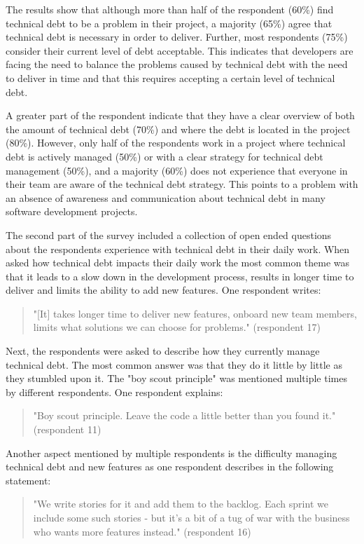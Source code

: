 

The results show that although more than half of the respondent (60\%) find technical debt to be a problem in their project, a majority (65\%) agree that technical debt is necessary in order to deliver.
Further, most respondents (75\%) consider their current level of debt acceptable.
This indicates that developers are facing the need to balance the problems caused by technical debt with the need to deliver in time and that this requires accepting a certain level of technical debt.

A greater part of the respondent indicate that they have a clear overview of both the amount of technical debt (70\%) and where the debt is located in the project (80\%).
However, only half of the respondents work in a project where technical debt is actively managed (50\%) or with a clear strategy for technical debt management (50\%), and a majority (60\%) does not experience that everyone in their team are aware of the technical debt strategy.
This points to a problem with an absence of awareness and communication about technical debt in many software development projects.

The second part of the survey included a collection of open ended questions about the respondents experience with technical debt in their daily work.
When asked how technical debt impacts their daily work the most common theme was that it leads to a slow down in the development process, results in longer time to deliver and limits the ability to add new features.
One respondent writes:
\begin{quote}
  "[It] takes longer time to deliver new features, onboard new team members, limits what solutions we can choose for problems." (respondent 17)
\end{quote}

Next, the respondents were asked to describe how they currently manage technical debt.
The most common answer was that they do it little by little as they stumbled upon it.
The "boy scout principle" was mentioned multiple times by different respondents.
One respondent explains:
\begin{quote}
  "Boy scout principle. Leave the code a little better than you found it." (respondent 11)
\end{quote}
Another aspect mentioned by multiple respondents is the difficulty managing technical debt and new features as one respondent describes in the following statement: 
\begin{quote}
  "We write stories for it and add them to the backlog. Each sprint we include some such stories - but it's a bit of a tug of war with the business who wants more features instead." (respondent 16)
\end{quote}

